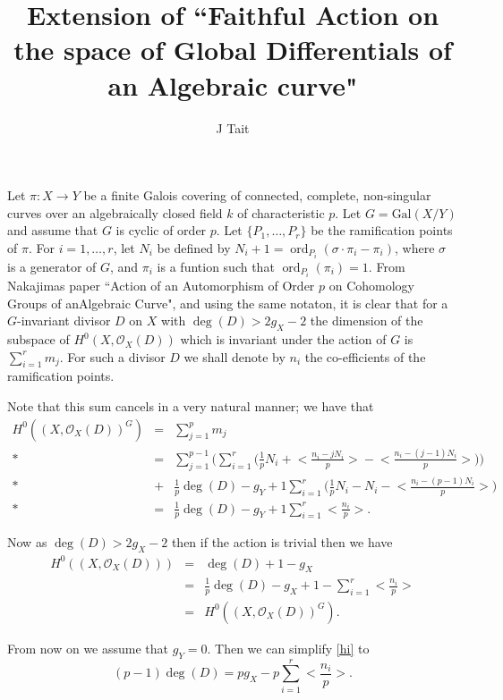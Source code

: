 \documentclass[11pt]{article} %
\title{Extension of ``Faithful Action on the space of Global Differentials of an Algebraic curve"}
\author{J Tait}
\DeclareMathOperator{\ord}{ord}
\begin{document}
\maketitle

Let $\pi :X \rightarrow Y$ be a finite Galois covering of connected, complete, non-singular curves over an algebraically closed field $k$ of characteristic $p$. Let $G=\mbox{Gal}(X/Y)$ and assume that $G$ is cyclic of order $p$. Let $\{ P_1,\ldots ,P_r\}$ be the ramification points of $\pi$. For $i=1,\ldots ,r$, let $N_i$ be defined by $N_i+1=\ord_{P_i}(\sigma\cdot\pi_i-\pi_i)$, where $\sigma$ is a generator of $G$, and $\pi_i$ is a funtion such that $\ord_{P_i}(\pi_i)=1$. From Nakajimas paper ``Action of an Automorphism of Order $p$ on Cohomology Groups of anAlgebraic Curve", and using the same notaton, it is clear that for a $G$-invariant divisor $D$ on $X$ with $\deg(D)>2g_X-2$ the dimension of the subspace of $H^0(X,\mathscr{O}_X(D))$ which is invariant under the action of $G$ is $\sum_{i=1}^r m_j$. For such a divisor $D$ we shall denote by $n_i$ the co-efficients of the ramification points.

Note that this sum cancels in a very natural manner; we have that
	\begin{eqnarray}
		H^0((X,\mathscr{O}_X(D))^G) & = & \sum_{j=1}^p m_j \\*
		& = & \sum_{j=1}^{p-1} \Big( \sum_{i=1}^r\Big(\frac{1}{p}N_i+\Big<\frac{n_i-jN_i}{p}\Big>-\Big<\frac{n_i-(j-1)N_i}{p}\Big>\Big)\Big) \\*
		& + & \frac{1}{p}\deg(D)-g_Y+1\sum_{i=1}^r\Big(\frac{1}{p}N_i-N_i-\Big<\frac{n_i-(p-1)N_i}{p}\Big>\Big) \\*
		& = & \frac{1}{p}\deg(D)-g_Y+1\sum_{i=1}^r \Big<\frac{n_i}{p}\Big>.
	\end{eqnarray}

Now as $\deg(D)>2g_X-2$ then if the action is trivial then we have
	\begin{eqnarray}
		H^0((X,\mathscr{O}_X(D))) & = & \deg(D)+1-g_X \\
		& = & \frac{1}{p}\deg(D)-g_X+1-\sum_{i=1}^r\Big<\frac{n_i}{p}\Big> \\ 
		& = & H^0((X,\mathscr{O}_X(D))^G). \label{hi}
	\end{eqnarray}

From now on we assume that $g_Y=0$. Then we can simplify \eqref{hi} to
	 \begin{equation}
		(p-1)\deg(D)=pg_X-p\sum_{i=1}^r\Big<\frac{n_i}{p}\Big>.\label{hi2}
	\end{equation}
\end{document}
